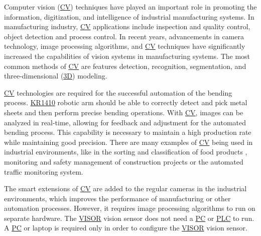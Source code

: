 
Computer vision (\hyperref[acro:CV]{CV}) techniques have played an important role in promoting the information, digitization, and intelligence of industrial manufacturing systems.
In manufacturing industry, \hyperref[acro:CV]{CV} applications include inspection and quality control, object detection and process control.
In recent years, advancements in camera technology, image processing algorithms, and \hyperref[acro:CV]{CV} techniques have significantly increased the capabilities of vision systems in manufacturing systems.
The most common methods of \hyperref[acro:CV]{CV} are features detection, recognition, segmentation, and three-dimensional (\hyperref[acro:3D]{3D}) modeling. \cite{9761203}

\hyperref[acro:CV]{CV} technologies are required for the successful automation of the bending process. \hyperref[acro:KR]{KR1410} robotic arm should be able to correctly detect and pick metal sheets and then perform precise bending operations. With \hyperref[acro:CV]{CV}, images can be analyzed in real-time, allowing for feedback and adjustment for the automated bending process.
This capability is necessary to maintain a high production rate while maintaining good precision.
There are many examples of \hyperref[acro:CV]{CV} being used in industrial environments, like in the sorting and classification of food products \cite{BARNES2010339, THROOP2005281,BURGOSARTIZZU2010138}, monitoring and safety management of construction projects \cite{PANERU2021103940} or the automated traffic monitoring system. \cite{7892717,COIFMAN1998271}

The smart extensions of \hyperref[acro:CV]{CV} are added to the regular cameras in the industrial environments, which improves the performance of manufacturing or other automation processes. \cite{BREZANI2022298} However, it requires image processing algorithms to run on separate hardware. 
The \hyperref[acro:VISOR]{VISOR}\textsuperscript{\textregistered} vision sensor does not need a \hyperref[acro:PC]{PC} or \hyperref[acro:PLC]{PLC} to run. A \hyperref[acro:PC]{PC} or laptop is required only in order to configure the
\hyperref[acro:VISOR]{VISOR}\textsuperscript{\textregistered} vision sensor. \cite[page 23]{visor_user_manual}